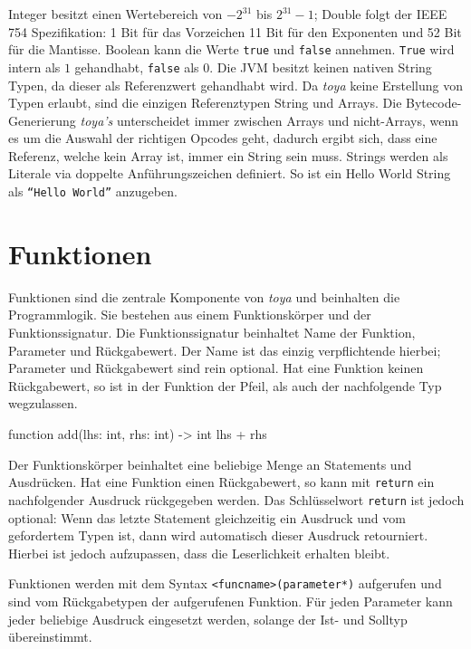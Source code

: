 Integer besitzt einen Wertebereich von $-2^{31}$ bis $2^{31} - 1$; Double folgt der IEEE 754 Spezifikation: 1 Bit für das Vorzeichen 11 Bit für den Exponenten und 52 Bit für die Mantisse. Boolean kann die Werte \texttt{true} und \texttt{false} annehmen. \texttt{True} wird intern als $1$ gehandhabt, \texttt{false} als 0. Die JVM besitzt keinen nativen String Typen, da dieser als Referenzwert gehandhabt wird. Da \textit{toya} keine Erstellung von Typen erlaubt, sind die einzigen Referenztypen String und Arrays. Die Bytecode-Generierung \textit{toya's} unterscheidet immer zwischen Arrays und nicht-Arrays, wenn es um die Auswahl der richtigen Opcodes geht, dadurch ergibt sich, dass eine Referenz, welche kein Array ist, immer ein String sein muss. Strings werden als Literale via doppelte Anführungszeichen definiert. So ist ein Hello World String als \texttt{``Hello World''} anzugeben.

\section{Funktionen}

Funktionen sind die zentrale Komponente von \textit{toya} und beinhalten die Programmlogik.
Sie bestehen aus einem Funktionskörper und der Funktionssignatur. Die Funktionssignatur beinhaltet Name der Funktion, Parameter und Rückgabewert. Der Name ist das einzig verpflichtende hierbei; Parameter und Rückgabewert sind rein optional. Hat eine Funktion keinen Rückgabewert, so ist in der Funktion der Pfeil, als auch der nachfolgende Typ wegzulassen.

\begin{ToyaCode}[numbers=none, caption={Eine typische Funktion unter toya.}]
function add(lhs: int, rhs: int) -> int {
    lhs + rhs
}
\end{ToyaCode}

Der Funktionskörper beinhaltet eine beliebige Menge an Statements und Ausdrücken. Hat eine Funktion einen Rückgabewert, so kann mit \texttt{return} ein nachfolgender Ausdruck rückgegeben werden. Das Schlüsselwort \texttt{return} ist jedoch optional: Wenn das letzte Statement gleichzeitig ein Ausdruck und vom gefordertem Typen ist, dann wird automatisch dieser Ausdruck retourniert. Hierbei ist jedoch aufzupassen, dass die Leserlichkeit erhalten bleibt.

Funktionen werden mit dem Syntax \texttt{<funcname>(parameter*)} aufgerufen und sind vom Rückgabetypen der aufgerufenen Funktion. Für jeden Parameter kann jeder beliebige Ausdruck eingesetzt werden, solange der Ist- und Solltyp übereinstimmt.


